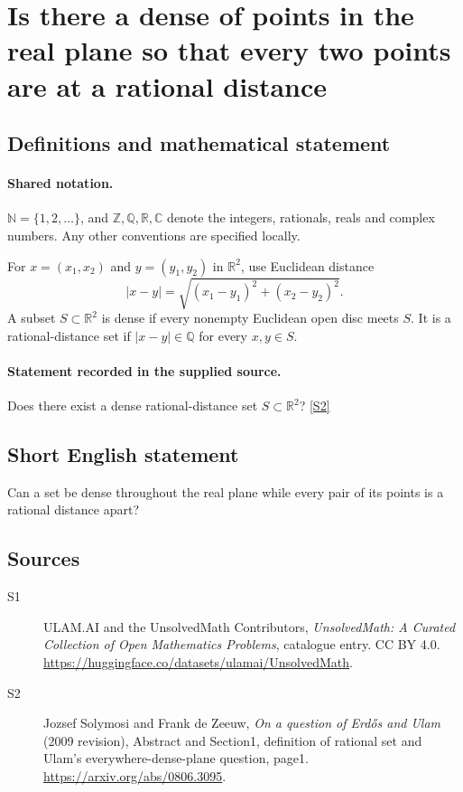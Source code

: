 \documentclass[11pt]{article}
\newcommand{\sref}[2]{\hyperlink{source:#1:#2}{[S#2]}}
\begin{document}
\section{Is there a dense of points in the real plane so that every two points are at a rational distance}\label{statement}

\subsection{Definitions and mathematical statement}

\paragraph{Shared notation.}$\mathbb N=\{1,2,\ldots\}$, and $\mathbb Z,\mathbb Q,\mathbb R,\mathbb C$ denote the integers, rationals, reals and complex numbers. Any other conventions are specified locally.


For $x=(x_1,x_2)$ and $y=(y_1,y_2)$ in $\mathbb R^2$, use Euclidean distance
\[|x-y|=\sqrt{(x_1-y_1)^2+(x_2-y_2)^2}.\]
A subset $S\subset\mathbb R^2$ is dense if every nonempty Euclidean open disc meets $S$. It is a rational-distance set if $|x-y|\in\mathbb Q$ for every $x,y\in S$.

\paragraph{Statement recorded in the supplied source.}
Does there exist a dense rational-distance set $S\subset\mathbb R^2$? \sref{statement}{2}

\subsection{Short English statement}
Can a set be dense throughout the real plane while every pair of its points is a rational distance apart?
\subsection{Sources}
\begin{description}
\item[\hypertarget{source:statement:1}{S1}] ULAM.AI and the UnsolvedMath Contributors, \emph{UnsolvedMath: A Curated Collection of Open Mathematics Problems}, catalogue entry. CC BY 4.0. \url{https://huggingface.co/datasets/ulamai/UnsolvedMath}.
\item[\hypertarget{source:statement:2}{S2}] Jozsef Solymosi and Frank de Zeeuw, \emph{On a question of Erdős and Ulam} (2009 revision), Abstract and Section1, definition of rational set and Ulam’s everywhere-dense-plane question, page1. \url{https://arxiv.org/abs/0806.3095}.
\end{description}
\label{end:statement}
\end{document}

